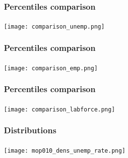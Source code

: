 \begin{frame}

    \label{perc_comparison_2}
    
    \frametitle{Percentiles comparison} %
    \framesubtitle{}  %
    \rmfamily %

    \begin{center}
        \texttt{[image: comparison\_unemp.png]}
    \end{center}
    
    \hyperlink{unemp_result}{}
    
\end{frame}

\begin{frame}

    \label{perc_comparison_3}
    
    \frametitle{Percentiles comparison} %
    \framesubtitle{}  %
    \rmfamily %

    \begin{center}
        \texttt{[image: comparison\_emp.png]}
    \end{center}
    
    \hyperlink{emp_result}{}
    
\end{frame}

\begin{frame}

    \label{perc_comparison_4}
    
    \frametitle{Percentiles comparison} %
    \framesubtitle{}  %
    \rmfamily %

    \begin{center}
        \texttt{[image: comparison\_labforce.png]}
    \end{center}
    
    \hyperlink{labforce_result}{}
    
\end{frame}

\begin{frame}

    \label{dist_1}
    
    \frametitle{Distributions} %
    \framesubtitle{}  %
    \rmfamily %

    \begin{center}
        \texttt{[image: mop010\_dens\_unemp\_rate.png]}
    \end{center}
    
    \hyperlink{unemp_rate_result}{}
    
\end{frame}

